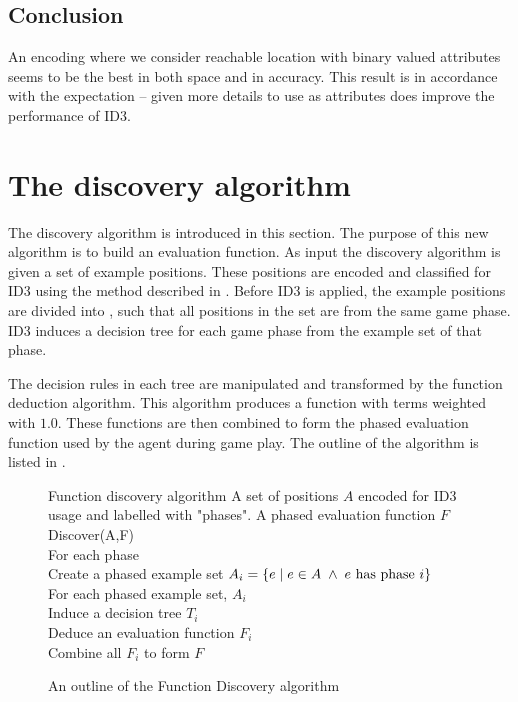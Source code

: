 \subsection{Conclusion}
An encoding where we consider reachable location with binary valued attributes seems to be the best in both space and in accuracy.  This result is in accordance with the expectation -- given more details to use as attributes does improve the performance of ID3.


\section{The discovery algorithm}
\label{sec:discovery_algorithm}
The discovery algorithm is introduced in this section.  The purpose of this new algorithm is to build an evaluation function. As input the discovery algorithm is given a set of example positions. These positions are encoded and classified for ID3 using the method described in .
Before ID3 is applied, the example positions are divided into , such that all positions in the set are from the same game phase.  ID3 induces a decision tree for each game phase from the example set of that phase.   

The decision rules in each tree are manipulated and transformed by the function deduction algorithm. This algorithm produces a function with terms weighted with $1.0$.  These functions are then combined to form the phased evaluation function used by the agent during game play.  The outline of the algorithm is listed in .  
\begin{figure}[!ht]
\begin{algorithm}
{Function discovery algorithm}
{A set of positions $A$ encoded for ID3 usage and labelled with "phases".}
{A phased evaluation function $F$} 
Discover(A,F) \+\\
For each phase \+ \\
 Create a phased example set $A_i = \{ e \; | \; e \in A \;\wedge\; e \mbox{ has phase } i \} $ \-\\
For each phased example set, $A_i$ \+ \\ 
 Induce a decision tree $T_i$ \\
 Deduce an evaluation function $F_i$\- \\
Combine all $F_i$ to form $F$ 
\end{algorithm}
\caption{An outline of the Function Discovery algorithm}
\label{alg:fd}	
\end{figure}

